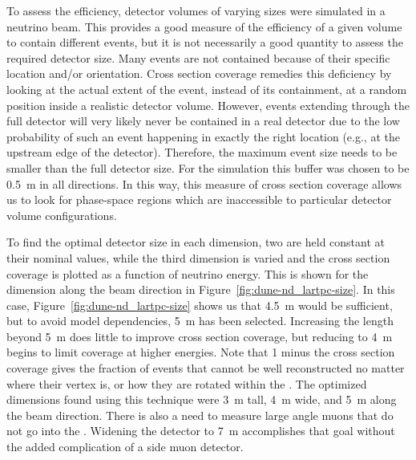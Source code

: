 To assess the efficiency, detector volumes of varying sizes were simulated in a neutrino beam.
This provides a good measure of the efficiency of a given volume to contain different events, but it is not necessarily a good quantity to assess the required detector size.
Many events are not contained because of their specific location and/or orientation.
Cross section coverage remedies this deficiency by looking at the actual extent of the event, instead of its containment, at a random position inside a realistic detector volume.
However, events extending through the full detector will very likely never be contained in a real detector due to the low probability of such an event happening in exactly the right location (e.g., at the upstream edge of the detector).
Therefore, the maximum event size needs to be smaller than the full detector size.
For the  simulation this buffer was chosen to be \SI{0.5}{\metre} in all directions.
In this way, this measure of cross section coverage allows us to look for phase-space regions which are inaccessible to particular detector volume configurations.

To find the optimal detector size in each dimension, two are held constant at their nominal values, while the third dimension is varied and the cross section coverage is plotted as a function of neutrino energy. 
This is shown for the dimension along the beam direction in Figure~\ref{fig:dune-nd_lartpc-size}. In this case, Figure~\ref{fig:dune-nd_lartpc-size} shows us that
\SI{4.5}{\metre} would be sufficient, but to avoid model dependencies, \SI{5}{\metre} has been selected.
Increasing the length beyond \SI{5}{\metre} does little to improve cross section coverage, but reducing to \SI{4}{\metre} begins to limit coverage at higher energies.
Note that 1 minus the cross section coverage gives the fraction of events that cannot be well reconstructed no matter where their vertex is, or how they are rotated within the . The optimized dimensions found using this technique were \SI{3}{\metre} tall, \SI{4}{\metre} wide, and \SI{5}{\metre} along the beam direction. There is also a need to measure large angle muons that do not go into the . Widening the detector to \SI{7}{\metre} accomplishes that goal without the added complication of a side muon detector. 


